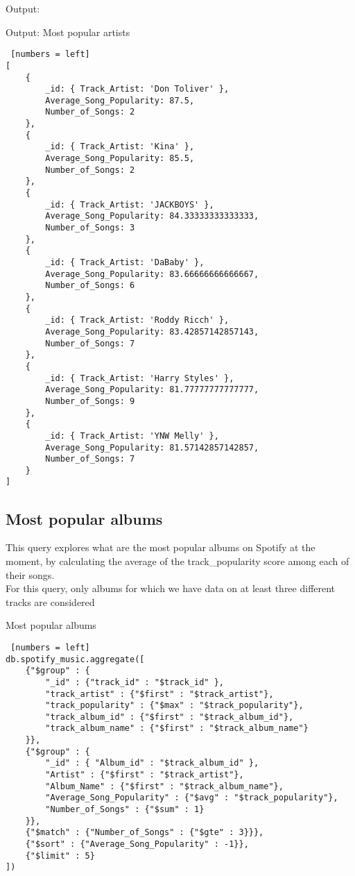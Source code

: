 \documentclass{Configuration_Files/PoliMi3i_thesis}
\begin{document}
Output:
\begin{algorithm}[h!]
\caption{Output: Most popular artists}
\begin{lstlisting} [numbers = left]
[
	{
		_id: { Track_Artist: 'Don Toliver' },
		Average_Song_Popularity: 87.5,
		Number_of_Songs: 2
	},
	{
		_id: { Track_Artist: 'Kina' },
		Average_Song_Popularity: 85.5,
		Number_of_Songs: 2
	},
	{
		_id: { Track_Artist: 'JACKBOYS' },
		Average_Song_Popularity: 84.33333333333333,
		Number_of_Songs: 3
	},
	{
		_id: { Track_Artist: 'DaBaby' },
		Average_Song_Popularity: 83.66666666666667,
		Number_of_Songs: 6
	},
	{
		_id: { Track_Artist: 'Roddy Ricch' },
		Average_Song_Popularity: 83.42857142857143,
		Number_of_Songs: 7
	},
	{
		_id: { Track_Artist: 'Harry Styles' },
		Average_Song_Popularity: 81.77777777777777,
		Number_of_Songs: 9
	},
	{
		_id: { Track_Artist: 'YNW Melly' },
		Average_Song_Popularity: 81.57142857142857,
		Number_of_Songs: 7
	}
]
\end{lstlisting}
\end{algorithm}
\newpage

\subsection{Most popular albums}
This query explores what are the most popular albums on Spotify at the moment, by calculating the average of the track\_popularity score among each of their songs.\\
For this query, only albums for which we have data on at least three different tracks are considered
\begin{algorithm}[ht]
\caption{Most popular albums}
\begin{lstlisting} [numbers = left]
db.spotify_music.aggregate([
	{"$group" : {
		"_id" : {"track_id" : "$track_id" },
		"track_artist" : {"$first" : "$track_artist"},
		"track_popularity" : {"$max" : "$track_popularity"},
		"track_album_id" : {"$first" : "$track_album_id"},
		"track_album_name" : {"$first" : "$track_album_name"}
	}},
	{"$group" : {
		"_id" : { "Album_id" : "$track_album_id" },
		"Artist" : {"$first" : "$track_artist"},
		"Album_Name" : {"$first" : "$track_album_name"},
		"Average_Song_Popularity" : {"$avg" : "$track_popularity"},
		"Number_of_Songs" : {"$sum" : 1}
	}},
	{"$match" : {"Number_of_Songs" : {"$gte" : 3}}},
	{"$sort" : {"Average_Song_Popularity" : -1}},
	{"$limit" : 5}
])
\end{lstlisting}
\end{algorithm}
\newpage
\end{document}
